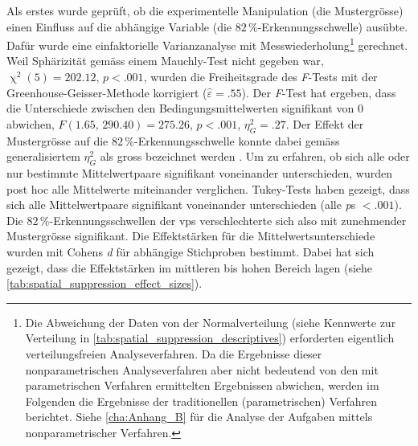 \documentclass[11pt, twoside, a4paper]{book}		%
\begin{document}
Als erstes wurde geprüft, ob die experimentelle Manipulation (die Mustergrösse) einen Einfluss auf die abhängige Variable (die $82\,\%$-Er\-ken\-nungs\-schwel\-le) ausübte. Dafür wurde eine einfaktorielle Varianzanalyse mit Messwiederholung\footnote{Die Abweichung der Daten von der Normalverteilung (siehe Kennwerte zur Verteilung in \autoref{tab:spatial_suppression_descriptives}) erforderten eigentlich verteilungsfreien Analyseverfahren. Da die Ergebnisse dieser nonparametrischen Analyseverfahren aber nicht bedeutend von den mit parametrischen Verfahren ermittelten Ergebnissen abwichen, werden im Folgenden die Ergebnisse der traditionellen (parametrischen) Verfahren berichtet. Siehe \autoref{cha:Anhang_B} für die Analyse der Aufgaben mittels nonparametrischer Verfahren.}
gerechnet. Weil Sphärizität gemäss einem Mauchly-Test nicht gegeben war, $\upchi^2(5)=202.12$, $p<.001$, wurden die Freiheitsgrade des \textit{F}-Tests mit der Greenhouse-Geisser-Methode korrigiert ($\hat{\varepsilon}=.55$).
Der \textit{F}-Test hat ergeben, dass die Unterschiede zwischen den Bedingungsmittelwerten signifikant von 0 abwichen, $F(1.65,\,290.40)=275.26$, $p<.001$, $\eta_{G}^2=.27$. Der Effekt der Mustergrösse auf die $82\,\%$-Erkennungsschwelle konnte dabei gemäss generalisiertem $\eta_{G}^2$ \citep{Olejnik2003} als gross bezeichnet werden \citep[S. 383]{Bakeman2005}.
Um zu erfahren, ob sich alle oder nur bestimmte Mittelwertpaare signifikant voneinander unterschieden, wurden post hoc alle Mittelwerte miteinander verglichen.
Tukey-Tests haben gezeigt, dass sich alle Mittelwertpaare signifikant voneinander unterschieden (alle \textit{p}s $<.001$).
Die $82\,\%$-Er\-ken\-nungs\-schwel\-len der \glspl{vp} verschlechterte sich also mit zunehmender Mustergrösse signifikant.
Die Effektstärken für die Mittelwertsunterschiede wurden mit Cohens \textit{d} für abhängige Stichproben \citep{Gibbons1993} bestimmt. 
Dabei hat sich gezeigt, dass die Effektstärken im mittleren bis hohen Bereich \citep[][S. 40]{Cohen1988} lagen (siehe \autoref{tab:spatial_suppression_effect_sizes}). 
\end{document}
